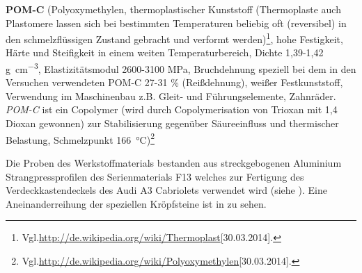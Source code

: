 \documentclass[12pt,a4paper,parskip,twoside,BCOR5mm,headsepline]{scrartcl}
\begin{document}
\begin{description*}
\begin{itemize*}
\item \textbf{POM-C} (Polyoxymethylen, thermoplastischer Kunststoff (Thermoplaste auch Plastomere lassen sich bei bestimmten Temperaturen beliebig oft (reversibel) in den schmelzflüssigen Zustand gebracht und verformt werden)\footnote{Vgl.\url{http://de.wikipedia.org/wiki/Thermoplast}[30.03.2014].},  hohe Festigkeit,  Härte und Steifigkeit in einem weiten Temperaturbereich, Dichte 1,39-1,42 \si{\gram\per\centi\meter\cubed}, Elastizitätsmodul 2600-3100 \si{\mega\pascal}, Bruchdehnung  speziell bei dem in den Versuchen verwendeten POM-C 27-31 \si{\percent} (Reißdehnung), weißer Festkunststoff, Verwendung im Maschinenbau z.B. Gleit- und Führungselemente, Zahnräder. \emph{POM-C} ist ein Copolymer (wird durch Copolymerisation von Trioxan mit 1,4 Dioxan gewonnen) zur Stabilisierung gegenüber Säureeinfluss und thermischer Belastung, Schmelzpunkt 
\SI{166}{\degreeCelsius})\footnote{Vgl.\url{http://de.wikipedia.org/wiki/Polyoxymethylen}[30.03.2014].}
\end{itemize*}
\newpage

Die Proben des Werkstoffmaterials bestanden aus streckgebogenen Aluminium Strangpressprofilen des Serienmaterials F13 welches zur Fertigung des Verdeckkastendeckels des Audi A3 Cabriolets verwendet wird  (siehe ). Eine Aneinanderreihung der speziellen Kröpfsteine ist in  zu sehen.
  




\end{description*}
\end{document}

